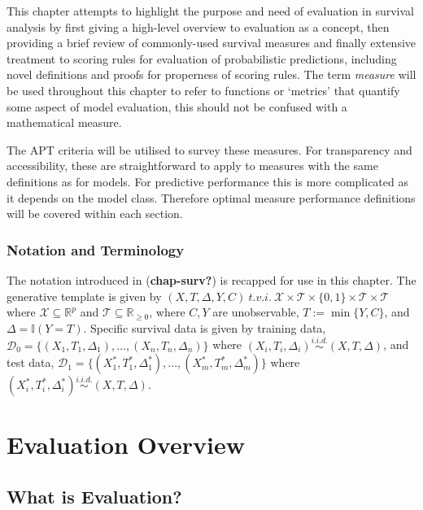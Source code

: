 \documentclass[
  letterpaper,
]{scrbook}
\theoremstyle{plain}
\theoremstyle{definition}
\theoremstyle{remark}
\begin{document}
This chapter attempts to highlight the purpose and need of evaluation in
survival analysis by first giving a high-level overview to evaluation as
a concept, then providing a brief review of commonly-used survival
measures and finally extensive treatment to scoring rules for evaluation
of probabilistic predictions, including novel definitions and proofs for
properness of scoring rules. The term \emph{measure} will be used
throughout this chapter to refer to functions or `metrics' that quantify
some aspect of model evaluation, this should not be confused with a
mathematical measure.

The APT criteria will be utilised to survey these measures. For
transparency and accessibility, these are straightforward to apply to
measures with the same definitions as for models. For predictive
performance this is more complicated as it depends on the model class.
Therefore optimal measure performance definitions will be covered within
each section.

\hypertarget{notation-and-terminology}{%
\subsubsection*{Notation and
Terminology}\label{notation-and-terminology}}

The notation introduced in (\textbf{chap-surv?}) is recapped for use in
this chapter. The generative template is given by
\((X,T,\Delta,Y,C) \ t.v.i. \ \mathcal{X}\times \mathcal{T}\times \{0,1\}\times \mathcal{T}\times \mathcal{T}\)
where \(\mathcal{X}\subseteq \mathbb{R}^p\) and
\(\mathcal{T}\subseteq \mathbb{R}_{\geq 0}\), where \(C,Y\) are
unobservable, \(T := \min\{Y,C\}\), and \(\Delta = \mathbb{I}(Y = T)\).
Specific survival data is given by training data,
\(\mathcal{D}_0= \{(X_1,T_1,\Delta_1),...,(X_n,T_n,\Delta_n)\}\) where
\((X_i,T_i,\Delta_i) \stackrel{i.i.d.}\sim(X,T,\Delta)\), and test data,
\(\mathcal{D}_1= \{(X^*_1,T^*_1,\Delta^*_1),...,(X^*_m,T^*_m,\Delta^*_m)\}\)
where \((X^*_i,T^*_i,\Delta^*_i) \stackrel{i.i.d.}\sim(X,T,\Delta)\).

\hypertarget{sec-eval-why}{%
\section{Evaluation Overview}\label{sec-eval-why}}

\hypertarget{sec-eval-why-what}{%
\subsection{What is Evaluation?}\label{sec-eval-why-what}}
\end{document}
